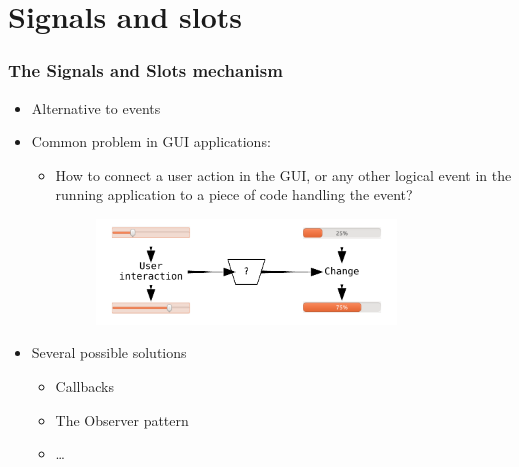 \section{Signals and slots}

\begin{frame}
  \frametitle{The Signals and Slots mechanism}
  \small
  \begin{itemize}
    \item Alternative to events
    \item Common problem in GUI applications:
    \begin{itemize}
      \item How to connect a user action in the GUI, or any other logical event
      in the running application to a piece of code handling the event?
      \begin{figure}[!t]
      \includegraphics[width=0.8\textwidth]{images/sig_slot_diag1.pdf}
      \end{figure}
    \end{itemize}
    \item Several possible solutions
    \begin{itemize}
      \item Callbacks
      \item The Observer pattern
      \item \ldots
    \end{itemize}
  \end{itemize}
\end{frame}


